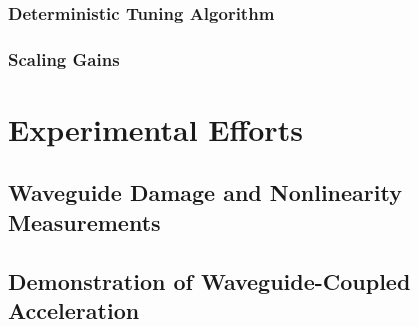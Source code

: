 \subsubsection{Deterministic Tuning Algorithm}

\subsubsection{Scaling Gains}

\section{Experimental Efforts}

\subsection{Waveguide Damage and Nonlinearity Measurements}

\subsection{Demonstration of Waveguide-Coupled Acceleration}
